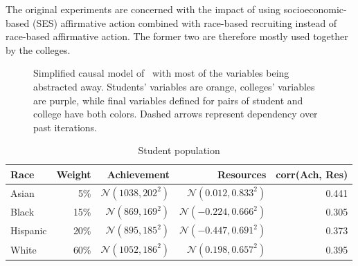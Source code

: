 The original experiments are concerned with the impact of using socioeconomic-based (SES) affirmative action combined with race-based recruiting instead of race-based affirmative action. The former two are therefore mostly used together by the colleges.

\begin{figure}[ht]
  \centering
  \caption{Simplified causal model of~\cite{reardon2018levels} with most of the variables being abstracted away.
Students' variables are \colorbox{PuOr-K}{orange}, colleges' variables are \colorbox{PuOr-E}{purple}, while final variables defined for pairs of student and college have both colors.
Dashed arrows represent dependency over past iterations.}
  \label{fig:model}
\end{figure}

\begin{table}[!ht]
    \centering
    \begin{tabular}{l r r r r} \toprule
        \textbf{Race} & \textbf{Weight} & \textbf{Achievement} & \textbf{Resources} & \textbf{corr(Ach, Res)} \\ \midrule
        Asian & 5\% & $\mathcal{N}(1038, 202^2)$ & $\mathcal{N}(0.012, 0.833^2)$ & 0.441 \\
        Black & 15\% & $\mathcal{N}(869, 169^2)$ & $\mathcal{N}(-0.224, 0.666^2)$ & 0.305 \\
        Hispanic & 20\% & $\mathcal{N}(895, 185^2)$ & $\mathcal{N}(-0.447, 0.691^2)$ & 0.373 \\
        White & 60\% & $\mathcal{N}(1052, 186^2)$ & $\mathcal{N}(0.198, 0.657^2)$ & 0.395 \\ \bottomrule
    \end{tabular}
    \caption{Student population}
    \label{tab:stud}
\end{table}

